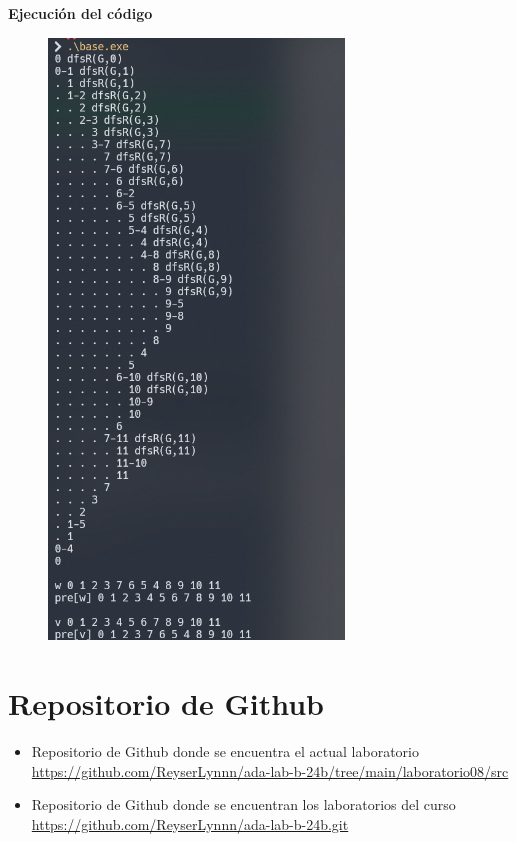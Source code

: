 \documentclass{article}
\begin{document}
    \textbf{Ejecución del código}
            \begin{figure}[H]
            	\centering
             	\includegraphics[width=0.7\textwidth,keepaspectratio]{img/exercise3.png}
            \end{figure}
 
\section{Repositorio de Github}
	\begin{itemize}
		\item Repositorio de Github donde se encuentra el actual laboratorio \\
		\url{https://github.com/ReyserLynnn/ada-lab-b-24b/tree/main/laboratorio08/src}

        \item Repositorio de Github donde se encuentran los laboratorios del curso\\
		\url{https://github.com/ReyserLynnn/ada-lab-b-24b.git}
	\end{itemize}

\end{document}
